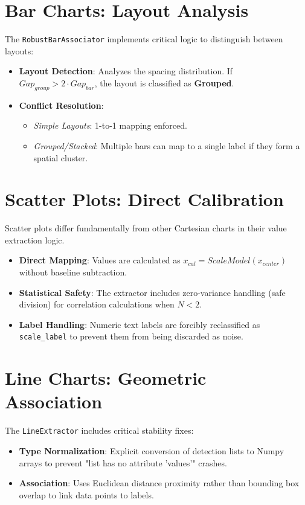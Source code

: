 \documentclass[11pt, a4paper]{report}
\begin{document}
\section{Bar Charts: Layout Analysis}
The \texttt{RobustBarAssociator} implements critical logic to distinguish between layouts:
\begin{itemize}
    \item \textbf{Layout Detection}: Analyzes the spacing distribution. If $Gap_{group} > 2 \cdot Gap_{bar}$, the layout is classified as \textbf{Grouped}.
    \item \textbf{Conflict Resolution}:
    \begin{itemize}
        \item \textit{Simple Layouts}: 1-to-1 mapping enforced.
        \item \textit{Grouped/Stacked}: Multiple bars can map to a single label if they form a spatial cluster.
    \end{itemize}
\end{itemize}

\section{Scatter Plots: Direct Calibration}
Scatter plots differ fundamentally from other Cartesian charts in their value extraction logic.
\begin{itemize}
    \item \textbf{Direct Mapping}: Values are calculated as $x_{cal} = ScaleModel(x_{center})$ without baseline subtraction.
    \item \textbf{Statistical Safety}: The extractor includes zero-variance handling (safe division) for correlation calculations when $N < 2$.
    \item \textbf{Label Handling}: Numeric text labels are forcibly reclassified as \texttt{scale\_label} to prevent them from being discarded as noise.
\end{itemize}

\section{Line Charts: Geometric Association}
The \texttt{LineExtractor} includes critical stability fixes:
\begin{itemize}
    \item \textbf{Type Normalization}: Explicit conversion of detection lists to Numpy arrays to prevent "list has no attribute 'values'" crashes.
    \item \textbf{Association}: Uses Euclidean distance proximity rather than bounding box overlap to link data points to labels.
\end{itemize}
\end{document}
